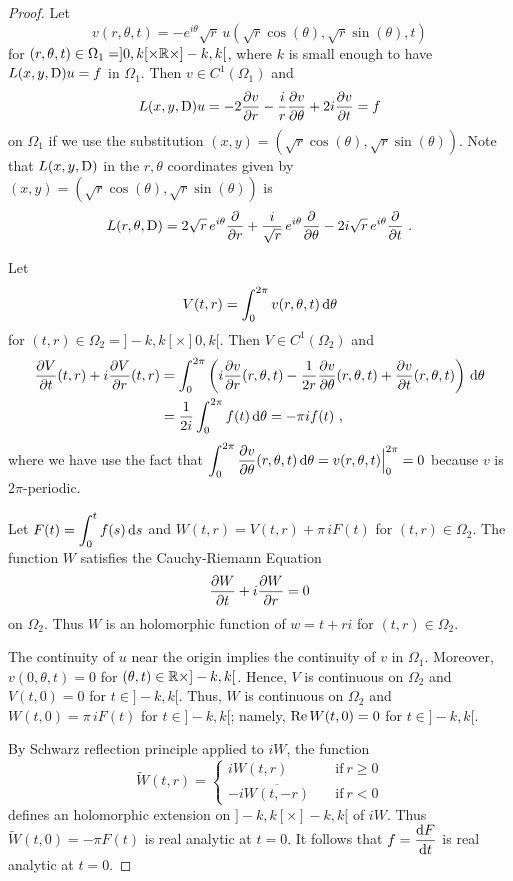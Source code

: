 \begin{proof}
Let
\[
v(r,\theta,t) = - e^{i\theta} \sqrt{r}
\, u(\sqrt{r}\cos(\theta) , \sqrt{r}\sin(\theta), t)
\]
for
$(r,\theta,t) \in \Omega_1 = ]0,k[\times \mathbb{R} \times ]-k,k[$,
where $k$ is small enough to have $L(x,y,\operatorname{D})u = f$ in $\Omega_1$.
Then $\displaystyle v \in C^1(\Omega_1)$ and
\[
L(x,y,\operatorname{D})u = -2 \frac{\partial{v}}{\partial r} - \frac{i}{r} \frac{\partial{v}}{\partial \theta}
+ 2i \frac{\partial{v}}{\partial t}
= f
\]
on $\Omega_1$ if we use the substitution 
$(x,y) = (\sqrt{r} \cos(\theta), \sqrt{r} \sin(\theta))$.  Note that
$L(x,y,\operatorname{D})$ in the $r,\theta$ coordinates given by
$(x,y) = (\sqrt{r} \cos(\theta), \sqrt{r} \sin(\theta))$ is
\[
  L(r,\theta,\operatorname{D}) = 2 \sqrt{r}\, e^{i\theta} \frac{\partial{}}{\partial r}
  + \frac{i}{\sqrt{r}} \, e^{i\theta} \frac{\partial{}}{\partial \theta} 
  - 2 i \sqrt{r} \, e^{i\theta} \frac{\partial{}}{\partial t} \ .
\]

Let
\[
V(t,r) = \int_0^{2\pi} v(r,\theta, t) \,\mathrm{d}{\theta}
\]
for $(t,r) \in \Omega_2 = ]-k,k[\times ]0,k[$.  Then
$\displaystyle V\in C^1(\Omega_2)$ and
\begin{align*}
\frac{\partial{V}}{\partial t}(t,r) + i \frac{\partial{V}}{\partial r}(t,r) 
&= \int_0^{2\pi} \left( i\frac{\partial{v}}{\partial r}(r,\theta,t)
- \frac{1}{2r} \frac{\partial{v}}{\partial \theta}(r,\theta, t)
+ \frac{\partial{v}}{\partial t}(r,\theta,t)  \right) \,\mathrm{d}{\theta} \\
&= \frac{1}{2i} \int_0^{2\pi} f(t) \,\mathrm{d}{\theta} = -\pi i f(t) \ ,
\end{align*}
where we have use the fact that
$\displaystyle \int_0^{2\pi} \frac{\partial{v}}{\partial \theta}(r,\theta,t) \,\mathrm{d}{\theta}
= v(r,\theta,t) \Big|_0^{2\pi} = 0 $ because $v$ is $2\pi$-periodic.

Let
$\displaystyle F(t) = \int_0^t f(s)\,\mathrm{d}{s}$ and $W(t,r) = V(t,r) + \pi\, i F(t)$
for $(t,r) \in \Omega_2$.  The function $W$ satisfies the
Cauchy-Riemann Equation
\[
\frac{\partial{W}}{\partial t} + i \frac{\partial{W}}{\partial r} = 0
\]
on $\Omega_2$.  Thus $W$ is an holomorphic function of $w = t+ r i$
for $(t,r) \in \Omega_2$.

The continuity of $u$ near the origin implies the continuity of $v$ in
$\Omega_1$.  Moreover, $v(0,\theta,t)=0$ for
$(\theta,t) \in \mathbb{R} \times ]-k,k[$.  Hence, $V$ is continuous on
$\Omega_2$ and $V(t,0) = 0$ for $t \in ]-k,k[$.  Thus,
$W$ is continuous on $\Omega_2$ and $W(t,0) = \pi\, i F(t)$ for
$t\in]-k,k[$; namely, $\operatorname{Re} W(t,0) = 0$ for $t\in]-k,k[$.

By Schwarz reflection principle applied to $iW$, the function
\[
\tilde{W}(t,r) = \begin{cases}
i W(t,r) & \quad \text{if} \ r \geq 0 \\[0.5em]
- i \overline{W(t,-r)} & \quad \text{if} \ r < 0
\end{cases}
\]
defines an holomorphic extension on $]-k,k[\times ]-k,k[$
of $i W$.  Thus $\tilde{W}(t,0) = - \pi F(t)$ is real analytic at $t = 0$.
It follows that $\displaystyle f = \frac{\mathrm{d}F}{\mathrm{d}{t}}$ is real
analytic at $t=0$.
\end{proof}

